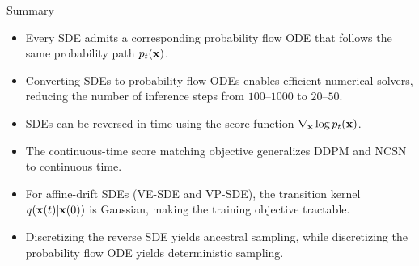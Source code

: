 \documentclass{beamer}
\begin{document}
\begin{frame}{Summary}
	\begin{itemize}
		\item Every SDE admits a corresponding probability flow ODE that follows the same probability path $p_t(\mathbf{x})$.
		\vfill
		\item Converting SDEs to probability flow ODEs enables efficient numerical solvers, reducing the number of inference steps from $100$--$1000$ to $20$--$50$.
		\vfill
		\item SDEs can be reversed in time using the score function $\nabla_{\mathbf{x}} \log p_t(\mathbf{x})$.
		\vfill
		\item The continuous-time score matching objective generalizes DDPM and NCSN to continuous time.
		\vfill
		\item For affine-drift SDEs (VE-SDE and VP-SDE), the transition kernel $q(\mathbf{x}(t) | \mathbf{x}(0))$ is Gaussian, making the training objective tractable.
		\vfill
		\item Discretizing the reverse SDE yields ancestral sampling, while discretizing the probability flow ODE yields deterministic sampling.
	\end{itemize}
\end{frame}
\end{document}
